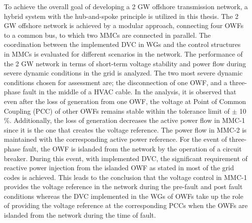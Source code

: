 To achieve the overall goal of developing a 2 GW offshore transmission network, a hybrid system with the hub-and-spoke principle is utilized in this thesis. The 2 GW offshore network is achieved by a modular approach, connecting four OWFs to a common bus, to which two MMCs are connected in parallel. The coordination between the implemented DVC in WGs and the control structures in MMCs is evaluated for different scenarios in the network. The performance of the 2 GW network in terms of short-term voltage stability and power flow during severe dynamic conditions in the grid is analyzed. The two most severe dynamic conditions chosen for assessment are; the disconnection of one OWF, and a three-phase fault in the middle of a HVAC cable. In the analysis, it is observed that even after the loss of generation from one OWF, the voltage at Point of Common Coupling (PCC) of other OWFs remains stable within the tolerance limit of $\pm$ 10 \%. Additionally, the loss of generation decreases the active power flow in MMC-1 since it is the one that creates the voltage reference. The power flow in MMC-2 is maintained with the corresponding active power reference. For the event of three-phase fault, the OWF is islanded from the network by the operation of a circuit breaker. During this event, with implemented DVC, the significant requirement of reactive power injection from the islanded OWF as stated in most of the grid codes is achieved. This leads to the conclusion that the voltage control in MMC-1 provides the voltage reference in the network during the pre-fault and post fault conditions whereas the DVC implemented in the WGs of OWFs take up the role of providing the voltage reference at the corresponding PCCs when the OWFs are islanded from the network during the time of fault. 
